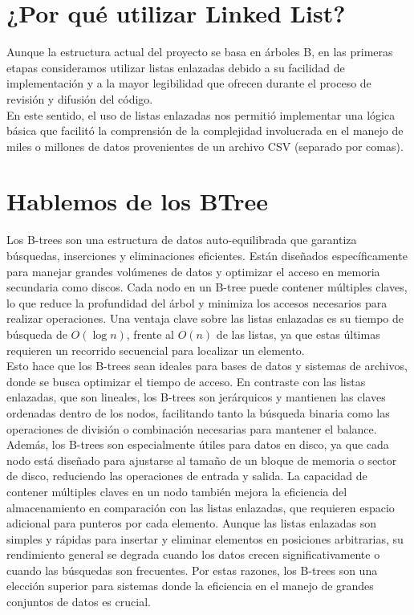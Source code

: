 \documentclass[12pt]{article}
\begin{document}
\begin{flushleft}
        \newpage
        
        \section{¿Por qué utilizar Linked List?}
        \noindent\hspace*{4em}Aunque la estructura actual del proyecto se basa en árboles B, en las primeras etapas consideramos utilizar listas enlazadas debido a su facilidad de implementación y a la mayor legibilidad que ofrecen durante el proceso de revisión y difusión del código.\\
        \noindent\hspace*{4em}En este sentido, el uso de listas enlazadas nos permitió implementar una lógica básica que facilitó la comprensión de la complejidad involucrada en el manejo de miles o millones de datos provenientes de un archivo CSV (separado por comas).
    
        \section{Hablemos de los BTree}
        \noindent\hspace*{4em}Los B-trees son una estructura de datos auto-equilibrada que garantiza búsquedas, inserciones y eliminaciones eficientes. Están diseñados específicamente para manejar grandes volúmenes de datos y optimizar el acceso en memoria secundaria como discos. Cada nodo en un B-tree puede contener múltiples claves, lo que reduce la profundidad del árbol y minimiza los accesos necesarios para realizar operaciones. Una ventaja clave sobre las listas enlazadas es su tiempo de búsqueda de \(O(\log n)\), frente al \(O(n)\) de las listas, ya que estas últimas requieren un recorrido secuencial para localizar un elemento.\\

        \noindent\hspace*{4em}Esto hace que los B-trees sean ideales para bases de datos y sistemas de archivos, donde se busca optimizar el tiempo de acceso. En contraste con las listas enlazadas, que son lineales, los B-trees son jerárquicos y mantienen las claves ordenadas dentro de los nodos, facilitando tanto la búsqueda binaria como las operaciones de división o combinación necesarias para mantener el balance. Además, los B-trees son especialmente útiles para datos en disco, ya que cada nodo está diseñado para ajustarse al tamaño de un bloque de memoria o sector de disco, reduciendo las operaciones de entrada y salida. La capacidad de contener múltiples claves en un nodo también mejora la eficiencia del almacenamiento en comparación con las listas enlazadas, que requieren espacio adicional para punteros por cada elemento. Aunque las listas enlazadas son simples y rápidas para insertar y eliminar elementos en posiciones arbitrarias, su rendimiento general se degrada cuando los datos crecen significativamente o cuando las búsquedas son frecuentes. Por estas razones, los B-trees son una elección superior para sistemas donde la eficiencia en el manejo de grandes conjuntos de datos es crucial.
    

\end{flushleft}
\end{document}
